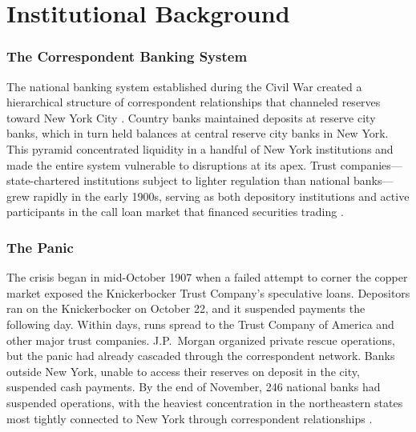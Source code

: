 \documentclass[12pt]{article}
\begin{document}
\section{Institutional Background}

\subsubsection*{The Correspondent Banking System} The national banking system established during the Civil War created a hierarchical structure of correspondent relationships that channeled reserves toward New York City \citep{james1978money, sprague1910history}. Country banks maintained deposits at reserve city banks, which in turn held balances at central reserve city banks in New York. This pyramid concentrated liquidity in a handful of New York institutions and made the entire system vulnerable to disruptions at its apex. Trust companies---state-chartered institutions subject to lighter regulation than national banks---grew rapidly in the early 1900s, serving as both depository institutions and active participants in the call loan market that financed securities trading \citep{moen1992bank}.

\subsubsection*{The Panic} The crisis began in mid-October 1907 when a failed attempt to corner the copper market exposed the Knickerbocker Trust Company's speculative loans. Depositors ran on the Knickerbocker on October 22, and it suspended payments the following day. Within days, runs spread to the Trust Company of America and other major trust companies. J.P.\ Morgan organized private rescue operations, but the panic had already cascaded through the correspondent network. Banks outside New York, unable to access their reserves on deposit in the city, suspended cash payments. By the end of November, 246 national banks had suspended operations, with the heaviest concentration in the northeastern states most tightly connected to New York through correspondent relationships \citep{wicker2000banking, frydman2023panic}.
\end{document}
